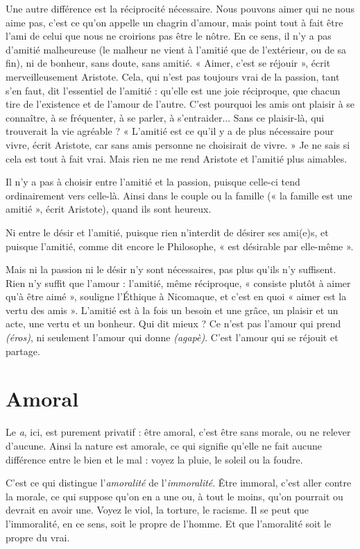 Une autre différence est la réciprocité nécessaire. Nous pouvons aimer qui
ne nous aime pas, c’est ce qu’on appelle un chagrin d’amour, mais point tout à
fait être l’ami de celui que nous ne croirions pas être le nôtre. En ce sens, il n’y
a pas d’amitié malheureuse (le malheur ne vient à l’amitié que de l'extérieur, ou
de sa fin), ni de bonheur, sans doute, sans amitié. « Aimer, c’est se réjouir »,
écrit merveilleusement Aristote. Cela, qui n’est pas toujours vrai de la passion,
tant s’en faut, dit l'essentiel de l'amitié : qu’elle est une joie réciproque, que
chacun tire de l’existence et de l’amour de l’autre. C’est pourquoi les amis ont
plaisir à se connaître, à se fréquenter, à se parler, à s’entraider... Sans ce plaisir-là,
qui trouverait la vie agréable ? « L'amitié est ce qu’il y a de plus nécessaire
pour vivre, écrit Aristote, car sans amis personne ne choisirait de vivre. » Je ne
sais si cela est tout à fait vrai. Mais rien ne me rend Aristote et l'amitié plus
aimables.

Il n’y a pas à choisir entre l'amitié et la passion, puisque celle-ci tend ordinairement
vers celle-là. Ainsi dans le couple ou la famille (« la famille est une
amitié », écrit Aristote), quand ils sont heureux.

Ni entre le désir et l'amitié, puisque rien n’interdit de désirer ses ami(e)s, et
puisque l'amitié, comme dit encore le Philosophe, « est désirable par elle-même ».

Mais ni la passion ni le désir n’y sont nécessaires, pas plus qu’ils n’y suffisent.
Rien n’y suffit que l’amour : l’amitié, même réciproque, « consiste plutôt
à aimer qu’à être aimé », souligne l’{\it }Éthique à Nicomaque, et c'est en quoi
« aimer est la vertu des amis ». L'amitié est à la fois un besoin et une grâce, un
plaisir et un acte, une vertu et un bonheur. Qui dit mieux ? Ce n'est pas
l'amour qui prend {\it (éros)}, ni seulement l'amour qui donne {\it (agapè)}. C'est
l'amour qui se réjouit et partage.

\section{Amoral}
Le {\it a}, ici, est purement privatif : être amoral, c’est être sans morale,
ou ne relever d’aucune. Ainsi la nature est amorale, ce qui signifie
qu’elle ne fait aucune différence entre le bien et le mal : voyez la pluie, le soleil
ou la foudre.

C’est ce qui distingue l’{\it amoralité} de l’{\it immoralité}. Être immoral, c’est aller
contre la morale, ce qui suppose qu’on en a une ou, à tout le moins, qu'on
pourrait ou devrait en avoir une. Voyez le viol, la torture, le racisme. Il se peut
que l’immoralité, en ce sens, soit le propre de l’homme. Et que l’amoralité soit
le propre du vrai.

